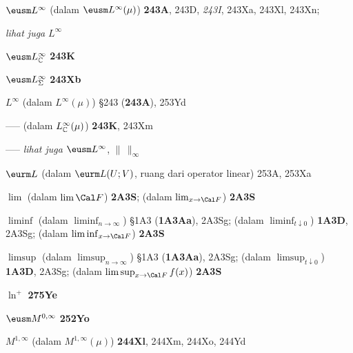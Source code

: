 $\eusm L^{\infty}$ (dalam $\eusm L^{\infty}(\mu)$) {\bf 243A}, 243D,
{\it 243I}, 243Xa, 243Xl, 243Xn;
  
  {\it lihat juga} $L^{\infty}$


$\eusm L^{\infty}_{\Bbb C}$ {\bf 243K}


$\eusm L^{\infty}_{\Sigma}$ {\bf 243Xb}


$L^{\infty}$ (dalam $L^{\infty}(\mu)$) \S243 ({\bf 243A}),
253Yd


----- (dalam $L^{\infty}_{\Bbb C}(\mu)$) {\bf 243K}, 243Xm






-----  {\it lihat juga} $\eusm L^{\infty}$,
$\|\,\|_{\infty}$




$\eurm L$ (dalam $\eurm L(U;V)$, ruang dari operator linear) 253A,
253Xa








$\lim$ (dalam $\lim\Cal F$) {\bf 2A3S};
  (dalam $\lim_{x\to\Cal F}$) {\bf 2A3S}


$\liminf$ (dalam $\liminf_{n\to\infty}$) \S1A3 ({\bf 1A3Aa}), 2A3Sg;
  (dalam $\liminf_{t\downarrow 0}$) {\bf 1A3D}, 2A3Sg;
  (dalam $\liminf_{x\to\Cal F}$) {\bf 2A3S}
  

$\limsup$ (dalam $\limsup_{n\to\infty}$) \S1A3 ({\bf 1A3Aa}), 2A3Sg;
  (dalam $\limsup_{t\downarrow 0}$) {\bf 1A3D}, 2A3Sg;
  (dalam $\limsup_{x\to\Cal F}f(x)$) {\bf 2A3S}







$\ln^+$ {\bf 275Ye}


\indexmedskip
{}









$\eusm M^{0,\infty}$ {\bf 252Yo}






$M^{1,\infty}$ (dalam $M^{1,\infty}(\mu)$) {\bf 244Xl}, 244Xm, 244Xo,
244Yd


















































